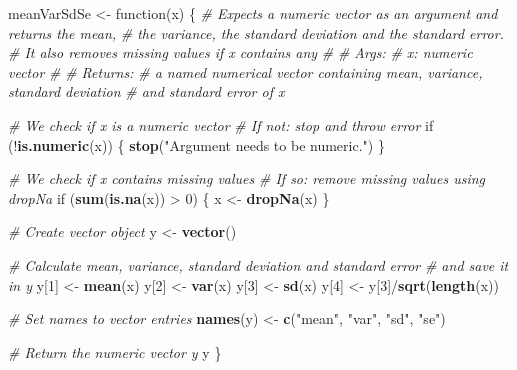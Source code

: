 \documentclass[11,]{article}
\newenvironment{Shaded}{\begin{snugshade}}{\end{snugshade}}
\newcommand{\KeywordTok}[1]{\textcolor[rgb]{0.13,0.29,0.53}{\textbf{{#1}}}}
\newcommand{\DecValTok}[1]{\textcolor[rgb]{0.00,0.00,0.81}{{#1}}}
\newcommand{\StringTok}[1]{\textcolor[rgb]{0.31,0.60,0.02}{{#1}}}
\newcommand{\CommentTok}[1]{\textcolor[rgb]{0.56,0.35,0.01}{\textit{{#1}}}}
\newcommand{\NormalTok}[1]{{#1}}
\begin{document}
\begin{Shaded}
\begin{Highlighting}[]
\NormalTok{meanVarSdSe <-}\StringTok{ }\NormalTok{function(x) \{}
  \CommentTok{# Expects a numeric vector as an argument and returns the mean,}
  \CommentTok{# the variance, the standard deviation and the standard error.}
  \CommentTok{# It also removes missing values if x contains any}
  \CommentTok{# }
  \CommentTok{# Args:}
  \CommentTok{#   x: numeric vector}
  \CommentTok{#}
  \CommentTok{# Returns:}
  \CommentTok{#   a named numerical vector containing mean, variance, standard deviation}
  \CommentTok{#   and standard error of x}
  
  \CommentTok{# We check if x is a numeric vector}
  \CommentTok{# If not: stop and throw error}
  \NormalTok{if (!}\KeywordTok{is.numeric}\NormalTok{(x)) \{}
    \KeywordTok{stop}\NormalTok{(}\StringTok{"Argument needs to be numeric."}\NormalTok{)}
  \NormalTok{\}}
  
  \CommentTok{# We check if x contains missing values}
  \CommentTok{# If so: remove missing values using dropNa}
  \NormalTok{if (}\KeywordTok{sum}\NormalTok{(}\KeywordTok{is.na}\NormalTok{(x)) >}\StringTok{ }\DecValTok{0}\NormalTok{) \{}
    \NormalTok{x <-}\StringTok{ }\KeywordTok{dropNa}\NormalTok{(x)}
  \NormalTok{\}}
  
  \CommentTok{# Create vector object}
  \NormalTok{y <-}\StringTok{ }\KeywordTok{vector}\NormalTok{()}
  
  \CommentTok{# Calculate mean, variance, standard deviation and standard error}
  \CommentTok{# and save it in y}
  \NormalTok{y[}\DecValTok{1}\NormalTok{] <-}\StringTok{ }\KeywordTok{mean}\NormalTok{(x)}
  \NormalTok{y[}\DecValTok{2}\NormalTok{] <-}\StringTok{ }\KeywordTok{var}\NormalTok{(x)}
  \NormalTok{y[}\DecValTok{3}\NormalTok{] <-}\StringTok{ }\KeywordTok{sd}\NormalTok{(x)}
  \NormalTok{y[}\DecValTok{4}\NormalTok{] <-}\StringTok{ }\NormalTok{y[}\DecValTok{3}\NormalTok{]/}\KeywordTok{sqrt}\NormalTok{(}\KeywordTok{length}\NormalTok{(x))}
  
  \CommentTok{# Set names to vector entries}
  \KeywordTok{names}\NormalTok{(y) <-}\StringTok{ }\KeywordTok{c}\NormalTok{(}\StringTok{"mean"}\NormalTok{, }\StringTok{"var"}\NormalTok{, }\StringTok{"sd"}\NormalTok{, }\StringTok{"se"}\NormalTok{)}
  
  \CommentTok{# Return the numeric vector y}
  \NormalTok{y}
\NormalTok{\}}
\end{Highlighting}
\end{Shaded}
\end{document}
